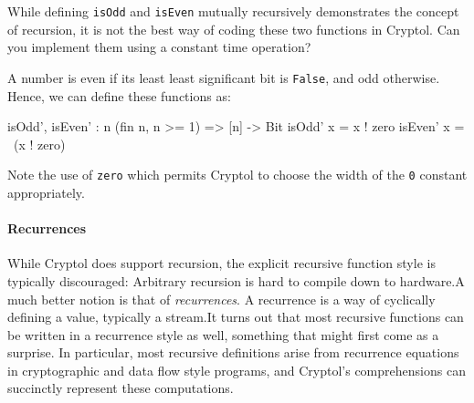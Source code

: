 \begin{Exercise}\label{ex:recfun:1:5}
  While defining {\tt isOdd} and {\tt isEven} mutually recursively
  demonstrates the concept of recursion, it is not the best way of
  coding these two functions in Cryptol. Can you implement them using
  a constant time operation? 
\end{Exercise}
\begin{Answer}
  A number is even if its least least significant bit is {\tt False},
  and odd otherwise. Hence, we can define these functions as:
\begin{code}
  isOdd', isEven' : {n} (fin n, n >= 1) => [n] -> Bit
  isOdd'  x = x ! zero
  isEven' x = ~(x ! zero)
\end{code}
Note the use of {\tt zero} which permits Cryptol to choose the width
of the \texttt{0} constant appropriately.
\end{Answer}

\paragraph*{Recurrences} While Cryptol does support recursion, the
explicit recursive function style is typically discouraged: Arbitrary
recursion is hard to compile down to hardware.\indRecurrence A much
better notion is that of {\em recurrences}. A recurrence is a way of
cyclically defining a value, typically a stream.\indStream It turns
out that most recursive functions can be written in a recurrence style
as well, something that might first come as a surprise. In particular,
most recursive definitions arise from recurrence equations in
cryptographic and data flow style programs, and Cryptol's
comprehensions can succinctly represent these computations.\indComp


